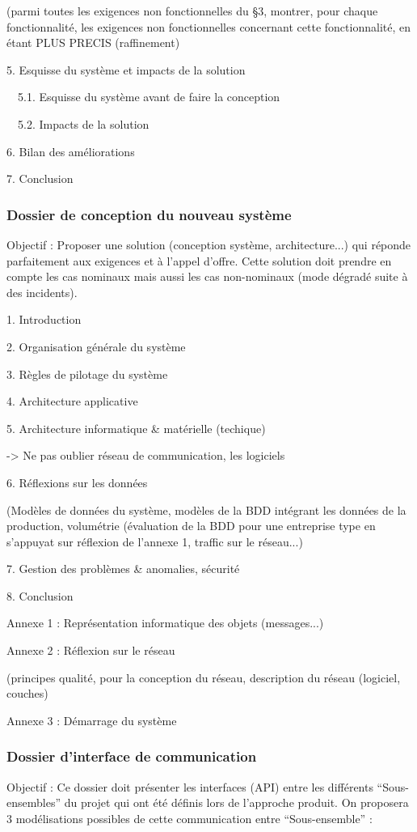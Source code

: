 \documentclass{mise_en_page}
\begin{document}
(parmi toutes les exigences non fonctionnelles du §3, montrer, pour
chaque fonctionnalité, les exigences non fonctionnelles concernant
cette fonctionnalité, en étant PLUS PRECIS (raffinement)

5. Esquisse du système et impacts de la solution

\ \ 5.1. Esquisse du système avant de faire la conception

\ \ 5.2. Impacts de la solution

6. Bilan des améliorations

7. Conclusion

\subsubsection{Dossier de conception du nouveau système}
Objectif : Proposer une solution (conception système, architecture...)
qui réponde parfaitement aux exigences et à l’appel d’offre. Cette
solution doit prendre en compte les cas nominaux mais aussi les cas
non-nominaux (mode dégradé suite à des incidents).

1. Introduction

2. Organisation générale du système

3. Règles de pilotage du système

4. Architecture applicative

5. Architecture informatique \& matérielle (techique)

{}-{\textgreater} Ne pas oublier réseau de communication, les logiciels

6. Réflexions sur les données

(Modèles de données du système, modèles de la BDD intégrant les données
de la production, volumétrie (évaluation de la BDD pour une entreprise
type en s’appuyat sur réflexion de l’annexe 1, traffic sur le
réseau...)

7. Gestion des problèmes \& anomalies, sécurité

8. Conclusion

Annexe 1 : Représentation informatique des objets (messages...)

Annexe 2 : Réflexion sur le réseau

(principes qualité, pour la conception du réseau, description du réseau
(logiciel, couches)

Annexe 3 : Démarrage du système

\subsubsection{Dossier d’interface de communication}
Objectif : Ce dossier doit présenter les interfaces (API) entre les
différents “Sous-ensembles” du projet qui ont été définis lors de
l’approche produit. On proposera 3 modélisations possibles de cette
communication entre “Sous-ensemble” :
\end{document}

